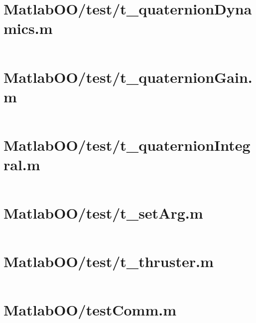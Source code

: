 \pagebreak
\section{MatlabOO/test/t\_quaternionDynamics.m}\label{code:MatlabOO/test/t_quaternionDynamics.m}
\inputminted[linenos,fontsize=\scriptsize]{matlab}{/home/dcouture/git/mathyourlife/TSatPy/beta_versions/matlab_object_oriented/test/t_quaternionDynamics.m}

\pagebreak
\section{MatlabOO/test/t\_quaternionGain.m}\label{code:MatlabOO/test/t_quaternionGain.m}
\inputminted[linenos,fontsize=\scriptsize]{matlab}{/home/dcouture/git/mathyourlife/TSatPy/beta_versions/matlab_object_oriented/test/t_quaternionGain.m}

\pagebreak
\section{MatlabOO/test/t\_quaternionIntegral.m}\label{code:MatlabOO/test/t_quaternionIntegral.m}
\inputminted[linenos,fontsize=\scriptsize]{matlab}{/home/dcouture/git/mathyourlife/TSatPy/beta_versions/matlab_object_oriented/test/t_quaternionIntegral.m}

\pagebreak
\section{MatlabOO/test/t\_setArg.m}\label{code:MatlabOO/test/t_setArg.m}
\inputminted[linenos,fontsize=\scriptsize]{matlab}{/home/dcouture/git/mathyourlife/TSatPy/beta_versions/matlab_object_oriented/test/t_setArg.m}

\pagebreak
\section{MatlabOO/test/t\_thruster.m}\label{code:MatlabOO/test/t_thruster.m}
\inputminted[linenos,fontsize=\scriptsize]{matlab}{/home/dcouture/git/mathyourlife/TSatPy/beta_versions/matlab_object_oriented/test/t_thruster.m}

\pagebreak
\section{MatlabOO/testComm.m}\label{code:MatlabOO/testComm.m}
\inputminted[linenos,fontsize=\scriptsize]{matlab}{/home/dcouture/git/mathyourlife/TSatPy/beta_versions/matlab_object_oriented/testComm.m}

